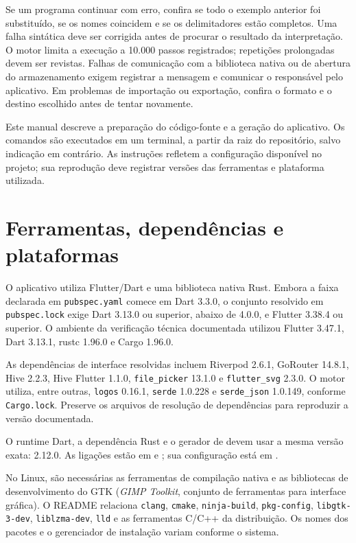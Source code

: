 Se um programa continuar com erro, confira se todo o exemplo anterior foi
substituído, se os nomes coincidem e se os delimitadores estão completos. Uma
falha sintática deve ser corrigida antes de procurar o resultado da interpretação.
O motor limita a execução a 10.000 passos registrados; repetições prolongadas
devem ser revistas. Falhas de comunicação com a biblioteca nativa ou de abertura
do armazenamento exigem registrar a mensagem e comunicar o responsável pelo
aplicativo. Em problemas de importação ou exportação, confira o formato e o
destino escolhido antes de tentar novamente.


Este manual descreve a preparação do código-fonte e a geração do aplicativo.
Os comandos são executados em um terminal, a partir da raiz do repositório,
salvo indicação em contrário. As instruções refletem a configuração disponível
no projeto; sua reprodução deve registrar versões das ferramentas e plataforma
utilizada.

\section*{Ferramentas, dependências e plataformas}

O aplicativo utiliza Flutter/Dart e uma biblioteca nativa Rust. Embora a faixa
declarada em \texttt{pubspec.yaml} comece em Dart 3.3.0, o conjunto resolvido em
\texttt{pubspec.lock} exige Dart 3.13.0 ou superior, abaixo de 4.0.0, e Flutter
3.38.4 ou superior. O ambiente da verificação técnica documentada utilizou Flutter
3.47.1, Dart 3.13.1, rustc 1.96.0 e Cargo 1.96.0. 

As dependências de interface resolvidas incluem Riverpod 2.6.1, GoRouter 14.8.1,
Hive 2.2.3, Hive Flutter 1.1.0, \texttt{file\_picker} 13.1.0 e
\texttt{flutter\_svg} 2.3.0. O motor utiliza, entre outras, \texttt{logos}
0.16.1, \texttt{serde} 1.0.228 e \texttt{serde\_json} 1.0.149, conforme
\texttt{Cargo.lock}. Preserve os arquivos de resolução de dependências para
reproduzir a versão documentada.

O runtime Dart, a dependência Rust e o gerador de
 devem usar a mesma versão exata: 2.12.0.
As ligações estão em  e
; sua configuração está em
.

No Linux, são necessárias as ferramentas de compilação nativa e as bibliotecas
de desenvolvimento do GTK (\textit{GIMP Toolkit}, conjunto de ferramentas para interface gráfica). O README relaciona \texttt{clang}, \texttt{cmake},
\texttt{ninja-build}, \texttt{pkg-config}, \texttt{libgtk-3-dev},
\texttt{liblzma-dev}, \texttt{lld} e as ferramentas C/C++ da distribuição.
Os nomes dos pacotes e o gerenciador de instalação variam conforme o sistema.

